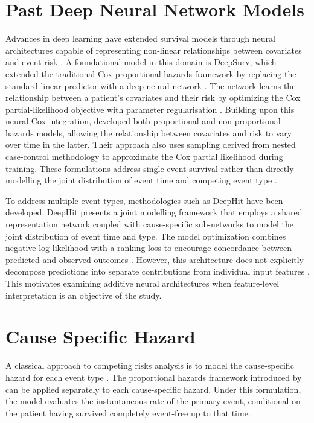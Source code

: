 \documentclass[a4paper,twoside,12pt]{report}
\begin{document}
\section{Past Deep Neural Network Models}
Advances in deep learning have extended survival models through neural architectures capable of representing non-linear relationships between covariates and event risk \citep{Katzman2018, kvamme2019}. A foundational model in this domain is DeepSurv, which extended the traditional Cox proportional hazards framework by replacing the standard linear predictor with a deep neural network \citep{Katzman2018}. The network learns the relationship between a patient's covariates and their risk by optimizing the Cox partial-likelihood objective with parameter regularisation \citep{Katzman2018}. Building upon this neural-Cox integration, \cite{kvamme2019} developed both proportional and non-proportional hazards models, allowing the relationship between covariates and risk to vary over time in the latter. Their approach also uses sampling derived from nested case-control methodology to approximate the Cox partial likelihood during training. These formulations address single-event survival rather than directly modelling the joint distribution of event time and competing event type \citep{Katzman2018, kvamme2019}.

To address multiple event types, methodologies such as DeepHit \cite{Lee2018} have been developed. DeepHit presents a joint modelling framework that employs a shared representation network coupled with cause-specific sub-networks to model the joint distribution of event time and type. The model optimization combines negative log-likelihood with a ranking loss to encourage concordance between predicted and observed outcomes \citep{Lee2018}. However, this architecture does not explicitly decompose predictions into separate contributions from individual input features \citep{Lee2018}. This motivates examining additive neural architectures when feature-level interpretation is an objective of the study.

\section{Cause Specific Hazard}
A classical approach to competing risks analysis is to model the cause-specific hazard for each event type \citep{prentice1978analysis}. The proportional hazards framework introduced by \cite{Cox1972} can be applied separately to each cause-specific hazard. Under this formulation, the model evaluates the instantaneous rate of the primary event, conditional on the patient having survived completely event-free up to that time.
\end{document}
